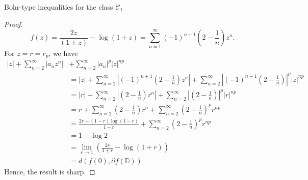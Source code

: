 \documentclass[12pt,a4paper,reqno]{amsart}
\theoremstyle{definition}
\theoremstyle{plain}
\numberwithin{equation}{section}
\begin{document}
\begin{section}{Bohr-type inequalities for the class $\mathcal{C}_1$}
\begin{proof}
\begin{equation}
    f(z)=\frac{2z}{(1+z)}- \log(1+z)= \sum_{n=1}^{\infty} (-1)^{n+1} \left(2-\frac{1}{n} \right) z^n.
\end{equation}
For  $z=r=r_p$, we have
\begin{align*}
|z|+ \sum_{n=2}^{\infty} |a_n z^n|& + \sum_{n=2}^{\infty} |a_n|^{p} |z|^{np}\\
&=|z|+ \sum_{n=2}^{\infty} \left| (-1)^{n+1} \left(2-\frac{1}{n} \right) z^n \right| + \sum_{n=2}^{\infty} {\left| (-1)^{n+1} \left(2-\frac{1}{n} \right) \right| }^p |z|^{np}\\
& =   |r|+ \sum_{n=2}^{\infty} \left| \left(2-\frac{1}{n} \right) r^n \right| + \sum_{n=2}^{\infty} {\left| \left(2-\frac{1}{n} \right) \right| }^p |r|^{np}\\
&= r+ \sum_{n=2}^{\infty}  \left(2-\frac{1}{n} \right) r^n  + \sum_{n=2}^{\infty} { \left(2-\frac{1}{n} \right)  }^p r^{np}\\
&=\frac{2 r+(1-r) \log(1-r)}{1-r}+\sum_{n=2}^{\infty} { \left(2-\frac{1}{n} \right)  }^p r^{np}\\
&=1-\log 2\\
& =\lim \limits_{r \rightarrow 1} \left(\frac{2r}{1+r}- \log(1+r)\right)\\
&= d(f(0), \partial{f(\mathbb{D})})
\end{align*}
Hence, the result is sharp.
\end{proof}


\end{section}
\end{document}
